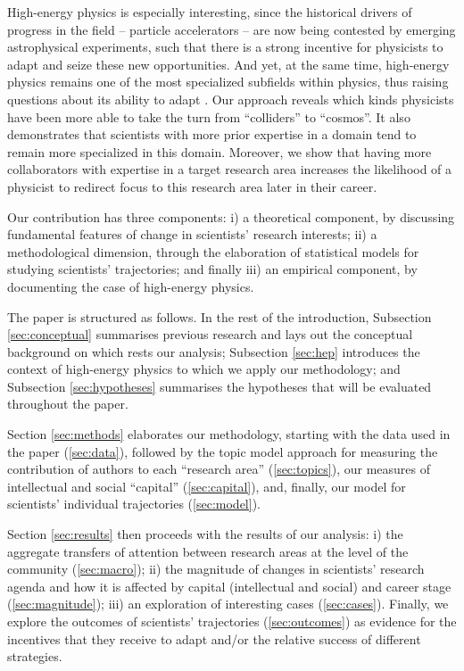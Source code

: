 \documentclass{article}
\begin{document}
High-energy physics is especially interesting, since the historical drivers of progress in the field -- particle accelerators -- are now being contested by emerging astrophysical experiments, such that there is a strong incentive for physicists to adapt and seize these new opportunities. And yet, at the same time, high-energy physics remains one of the most specialized subfields within physics, thus raising questions about its ability to adapt \citep{Battiston2019,Aleta2019}. Our approach reveals which kinds physicists have been more able to take the turn from ``colliders'' to ``cosmos''. It also demonstrates that scientists with more prior expertise in a domain tend to remain more specialized in this domain. Moreover, we show that having more collaborators with expertise in a target research area increases the likelihood of a physicist to redirect focus to this research area later in their career.

Our contribution has three components: i) a theoretical component, by discussing fundamental features of change in scientists' research interests; ii) a methodological dimension, through the elaboration of statistical models for studying scientists' trajectories; and finally iii) an empirical component, by documenting the case of high-energy physics.

The paper is structured as follows. In the rest of the introduction, Subsection \ref{sec:conceptual} summarises previous research and lays out the conceptual background on which rests our analysis; Subsection \ref{sec:hep} introduces the context of high-energy physics to which we apply our methodology; and Subsection \ref{sec:hypotheses} summarises the hypotheses that will be evaluated throughout the paper.

Section \ref{sec:methods} elaborates our methodology, starting with the data used in the paper (\ref{sec:data}), followed by the topic model approach for measuring the contribution of authors to each ``research area'' (\ref{sec:topics}), our measures of intellectual and social ``capital'' (\ref{sec:capital}), and, finally, our model for scientists' individual trajectories (\ref{sec:model}).

Section \ref{sec:results} then proceeds with the results of our analysis: i) the aggregate transfers of attention between research areas at the level of the community (\ref{sec:macro}); ii) the magnitude of changes in scientists' research agenda and how it is affected by capital (intellectual and social) and career stage (\ref{sec:magnitude}); iii) an exploration of interesting cases (\ref{sec:cases}). Finally, we explore the outcomes of scientists' trajectories (\ref{sec:outcomes}) as evidence for the incentives that they receive to adapt and/or the relative success of different strategies. 
\end{document}
